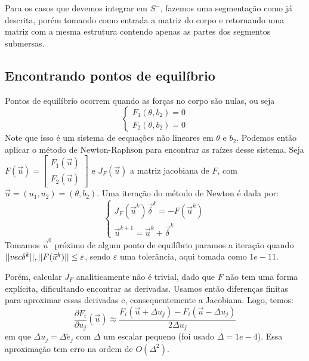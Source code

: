 \documentclass[
	12pt,				%
	oneside,			%
	a4paper,			%
	]{article}
\begin{document}
    Para os casos que devemos integrar em $S^-$, fazemos uma segmentação como já descrita, porém tomando como entrada a matriz do corpo e retornando uma matriz com a mesma estrutura contendo apenas as partes dos segmentos submersas.

    \subsection{Encontrando pontos de equilíbrio}
    Pontos de equilíbrio ocorrem quando as forças no corpo são nulas, ou seja
    \begin{equation}
        \begin{cases}
            F_1(\theta, b_2) = 0 \\
            F_2(\theta, b_2) = 0
        \end{cases}
        \label{eq:equilibrium}
    \end{equation}
    Note que isso é um sistema de eequações não lineares em $\theta$ e $b_2$. Podemos então aplicar o método de Newton-Raphson para encontrar as raízes desse sistema. Seja $F(\vec{u}) = \begin{bmatrix}
        F_1(\vec{u}) \\
        F_2(\vec{u})
    \end{bmatrix}$ e $J_F(\vec{u})$ a matriz jacobiana de $F$, com $\vec{u} = (u_1, u_2) = (\theta, b_2)$. Uma iteração do método de Newton é dada por:
    \begin{equation}
        \begin{cases}
            J_F(\vec{u}^k) \vec{\delta}^k = -F(\vec{u}^k) \\
            \vec{u}^{k+1} = \vec{u}^k + \vec{\delta}^k
        \end{cases}
        \label{eq:Newton}
    \end{equation}
    Tomamos $\vec{u}^0$ próximo de algum ponto de equilíbrio paramos a iteração quando $\\||vec{\delta}^k||, ||F(\vec{u}^k)|| \le \varepsilon$, sendo $\varepsilon$ uma tolerância, aqui tomada como $1e-11$.

    Porém, calcular $J_F$ analiticamente não é trivial, dado que $F$ não tem uma forma explícita, dificultando encontrar as derivadas. Usamos então diferenças finitas para aproximar essas derivadas e, consequentemente a Jacobiana. Logo, temos:
    \begin{equation}
        \frac{\partial F_i}{\partial u_j}(\vec{u}) \approx \frac{F_i(\vec{u} + \Delta u_j) - F_i(\vec{u} - \Delta u_j)}{2 \Delta u_j}
        \label{eq:fin_dif}
    \end{equation}
    em que $\Delta u_j = \Delta\check{e}_j$ com $\Delta$ um escalar pequeno (foi usado $\Delta = 1e-4$). Essa aproximação tem erro na ordem de $O(\Delta^2)$.
\end{document}
